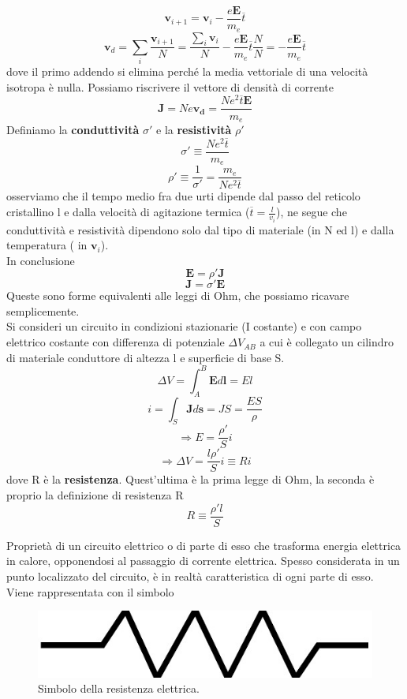 \documentclass[
10pt, %
a4paper, %
oneside, %
headinclude,footinclude, %
BCOR5mm, %
]{scrartcl}
\begin{document}
\[\mathbf{v}_{i+1}  = \mathbf{v}_i - \frac{e\mathbf{E}}{m_e}\overline{t}\]
\[\mathbf{v}_d = \sum_i\frac{\mathbf{v}_{i+1}}{N}= \frac{\sum_i\mathbf{v}_i}{N} - \frac{e\mathbf{E}}{m_e}\overline{t} \frac{N}{N} = - \frac{e\mathbf{E}}{m_e}\overline{t}\]
dove il primo addendo si elimina perché la media vettoriale di una velocità isotropa è nulla. Possiamo riscrivere il vettore di densità di corrente
\[\mathbf{J}= Ne\mathbf{v_d}= \frac{Ne^2\overline{t}\mathbf{E}}{m_e}\]
Definiamo la \textbf{conduttività} $\sigma'$ e la \textbf{resistività} $\rho'$
\[\sigma' \equiv \frac{Ne^2\overline{t}}{m_e}\]
\[\rho' \equiv \frac{1}{\sigma'}= \frac{m_e}{Ne^2\overline{t}}\]
osserviamo che il tempo medio fra due urti dipende dal passo del reticolo cristallino l e dalla velocità di agitazione termica (\(\overline{t}= \frac{l}{v_i}\)), ne segue che conduttività e resistività dipendono solo dal tipo di materiale (in N ed l) e dalla temperatura ( in $\mathbf{v}_i$). \\
In conclusione
\[\mathbf{E}= \rho' \mathbf{J}\]
\[\mathbf{J}= \sigma' \mathbf{E}\]
Queste sono forme equivalenti alle leggi di Ohm, che possiamo ricavare semplicemente.\\
Si consideri un circuito in condizioni stazionarie (I costante) e con campo elettrico costante con differenza di potenziale \(\Delta V_{AB}\) a cui è collegato un cilindro di materiale conduttore di altezza l e superficie di base S. 
\[\Delta V = \int_{A}^{B}\mathbf{E}d\mathbf{l}=El\]
\[i = \int_S \mathbf{J}d\mathbf{s}= JS= \frac{E S}{\rho}\]
\[\Rightarrow E = \frac{\rho'}{S}i\]
\[\Rightarrow \Delta V = \frac{l\rho'}{S}i \equiv R i\]
dove R è la \textbf{resistenza}. Quest'ultima è la prima legge di Ohm, la seconda è proprio la definizione di resistenza R
\[R \equiv \frac{\rho' l}{S}\]
\begin{definizione}[Resistenza]
Proprietà di un circuito elettrico o di parte di esso che trasforma energia elettrica in calore, opponendosi al passaggio di corrente elettrica. Spesso considerata in un punto localizzato del circuito, è in realtà caratteristica di ogni parte di esso. Viene rappresentata con il simbolo
\begin{figure}[h!]
	\centering
	\includegraphics[width=0.3\linewidth]{images/resistenza}
	\caption{Simbolo della resistenza elettrica.}
	\label{fig:resistenza}
\end{figure}
\FloatBarrier
\end{definizione}
\end{document}
